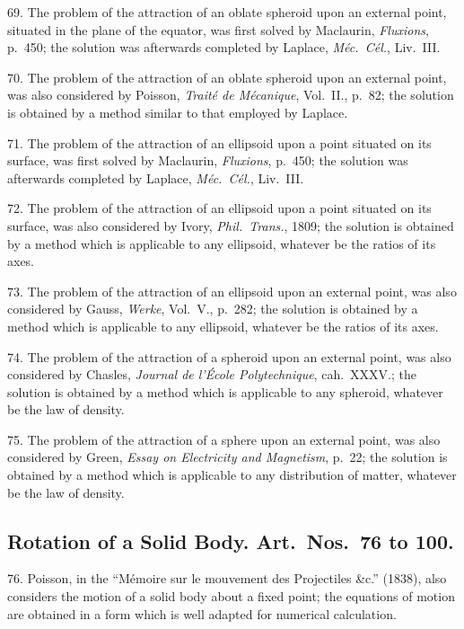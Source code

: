 \documentclass[11pt,a4paper]{article}
\begin{document}
69. The problem of the attraction of an oblate spheroid upon an external point, situated in the plane of the equator, was first solved by Maclaurin, \textit{Fluxions}, p.~450; the solution was afterwards completed by Laplace, \textit{M\'ec.\ C\'el.}, Liv.~III.

\newpage
\setcounter{page}{531}

70. The problem of the attraction of an oblate spheroid upon an external point, was also considered by Poisson, \textit{Trait\'e de M\'ecanique}, Vol.~II., p.~82; the solution is obtained by a method similar to that employed by Laplace.

71. The problem of the attraction of an ellipsoid upon a point situated on its surface, was first solved by Maclaurin, \textit{Fluxions}, p.~450; the solution was afterwards completed by Laplace, \textit{M\'ec.\ C\'el.}, Liv.~III.

72. The problem of the attraction of an ellipsoid upon a point situated on its surface, was also considered by Ivory, \textit{Phil.\ Trans.}, 1809; the solution is obtained by a method which is applicable to any ellipsoid, whatever be the ratios of its axes.

73. The problem of the attraction of an ellipsoid upon an external point, was also considered by Gauss, \textit{Werke}, Vol.~V., p.~282; the solution is obtained by a method which is applicable to any ellipsoid, whatever be the ratios of its axes.

74. The problem of the attraction of a spheroid upon an external point, was also considered by Chasles, \textit{Journal de l'\'Ecole Polytechnique}, cah.~XXXV.; the solution is obtained by a method which is applicable to any spheroid, whatever be the law of density.

75. The problem of the attraction of a sphere upon an external point, was also considered by Green, \textit{Essay on Electricity and Magnetism}, p.~22; the solution is obtained by a method which is applicable to any distribution of matter, whatever be the law of density.

\subsection*{Rotation of a Solid Body. Art.\ Nos.\ 76 to 100.}

76. Poisson, in the ``M\'emoire sur le mouvement des Projectiles \&c.'' (1838), also considers the motion of a solid body about a fixed point; the equations of motion are obtained in a form which is well adapted for numerical calculation.
\end{document}

